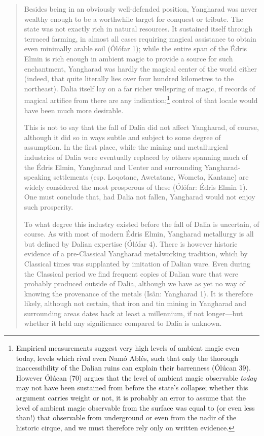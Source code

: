 \documentclass{article}
\begin{document}
\begin{quotation}
Besides being in an obviously well-defended position, Yangharad was never wealthy enough to be a worthwhile target for conquest or tribute. The state was not exactly rich in natural resources. It sustained itself through terraced farming, in almost all cases requiring magical assistance to obtain even minimally arable soil (Ólófar 1); while the entire span of the Édris Elmin is rich enough in ambient magic to provide a source for such enchantment, Yangharad was hardly the magical center of the world either (indeed, that quite literally lies over four hundred kilometres to the northeast). Dalia itself lay on a far richer wellspring of magic, if records of magical artifice from there are any indication;\footnote{Empirical measurements suggest very high levels of ambient magic even today, levels which rival even Namó Ablés, such that only the thorough inaccessibility of the Dalian ruins can explain their barrenness (Ólúcan 39). However Ólúcan (70) argues that the level of ambient magic observable \emph{today} may not have been sustained from before the state's collapse; whether this argument carries weight or not, it is probably an error to assume that the level of ambient magic observable from the surface was equal to (or even less than!) that observable from underground or even from the nadir of the historic cirque, and we must therefore rely only on written evidence.} control of that locale would have been much more desirable.

This is not to say that the fall of Dalia did not affect Yangharad, of course, although it did so in ways subtle and subject to some degree of assumption. In the first place, while the mining and metallurgical industries of Dalia were eventually replaced by others spanning much of the Édris Elmin, Yangharad and Uenter and surrounding Yangharad-speaking settlements (esp. Loqotane, Awetatane, Wometa, Kantane) are widely considered the most prosperous of these (Ólófar: Édris Elmin 1). One must conclude that, had Dalia not fallen, Yangharad would not enjoy such prosperity.

To what degree this industry existed before the fall of Dalia is uncertain, of course. As with most of modern Édris Elmin, Yangharad metallurgy is all but defined by Dalian expertise (Ólófar 4). There is however historic evidence of a pre-Classical Yangharad metalworking tradition, which by Classical times was supplanted by imitation of Dalian ware. Even during the Classical period we find frequent copies of Dalian ware that were probably produced outside of Dalia, although we have as yet no way of knowing the provenance of the metals (Isân: Yangharad 1). It is therefore likely, although not certain, that iron and tin mining in Yangharad and surrounding areas dates back at least a millennium, if not longer—but whether it held any significance compared to Dalia is unknown.


\end{quotation}
\end{document}
